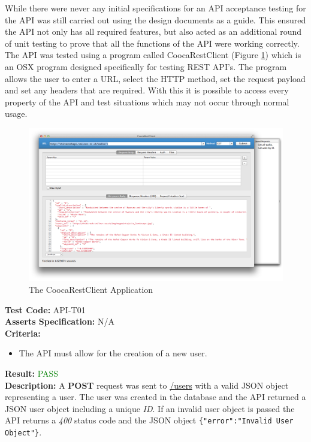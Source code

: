 \documentclass[11pt,a4paper]{report}
\begin{document}
While there were never any initial specifications for an API acceptance testing for the API was still carried out using the design documents as a guide. This ensured the API not only has all required features, but also acted as an additional round of unit testing to prove that all the functions of the API were working correctly. The API was tested using a program called CoocaRestClient (Figure \ref{fig:coocaRest}) which is an OSX program designed specifically for testing REST API's. The program allows the user to enter a URL, select the HTTP method, set the request payload and set any headers that are required. With this it is possible to access every property of the API and test situations which may not occur through normal usage. \\

\begin{figure}[H]
   \centering
   \includegraphics[width=\textwidth]{CoocaRestClient} %
   \caption{The CoocaRestClient Application}
   \label{fig:coocaRest}
\end{figure}

\label{test:API-T01}
\noindent\textbf{Test Code:} API-T01\\
\textbf{Asserts Specification:} N/A \\ 
\textbf{Criteria:} \begin{itemize}
                     \item The API must allow for the creation of a new user.
                   \end{itemize}  
\textbf{Result:} \textcolor{green}{PASS}\\ 
\textbf{Description:} A \textbf{POST} request was sent to \url{/users} with a valid JSON object representing a user. The user was created in the database and the API returned a JSON user object including a unique \textit{ID}. If an invalid user object is passed the API returns a \textit{400} status code and the JSON object \lstinline${"error":"Invalid User Object"}$.\\ 
\end{document}

